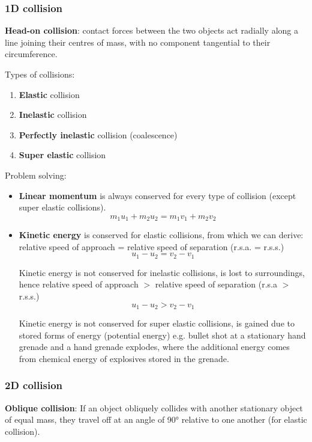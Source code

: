 \subsubsection{1D collision}
\textbf{Head-on collision}: contact forces between the two objects act radially along a line joining their centres of mass, with no component tangential to their circumference.

Types of collisions:
\begin{enumerate}
\item \textbf{Elastic} collision
\item \textbf{Inelastic} collision
\item \textbf{Perfectly inelastic} collision (coalescence)
\item \textbf{Super elastic} collision
\end{enumerate}

Problem solving:
\begin{itemize}
\item \textbf{Linear momentum} is always conserved for every type of collision (except super elastic collisions). \[ m_1 u_1 + m_2 u_2 = m_1 v_1 + m_2 v_2 \]

\item \textbf{Kinetic energy} is conserved for elastic collisions, from which we can derive: relative speed of approach = relative speed of separation (r.s.a. = r.s.s.) \[ u_1-u_2 = v_2-v_1 \] 
 
Kinetic energy is not conserved for inelastic collisions, is lost to surroundings, hence relative speed of approach $>$ relative speed of separation (r.s.a $>$ r.s.s.) \[ u_1-u_2 > v_2-v_1 \]

Kinetic energy is not conserved for super elastic collisions, is gained due to stored forms of energy (potential energy) e.g. bullet shot at a stationary hand grenade and a hand grenade explodes, where the additional energy comes from chemical energy of explosives stored in the grenade.
\end{itemize}

\subsubsection{2D collision}
\textbf{Oblique collision}: 
If an object obliquely collides with another stationary object of equal mass, they travel off at an angle of 90° relative to one another (for elastic collision).
\pagebreak

